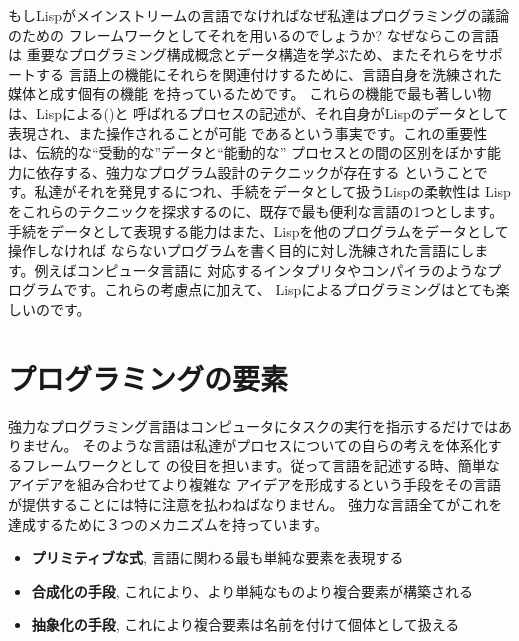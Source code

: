 もしLispがメインストリームの言語でなければなぜ私達はプログラミングの議論のための
フレームワークとしてそれを用いるのでしょうか? なぜならこの言語は
重要なプログラミング構成概念とデータ構造を学ぶため、またそれらをサポートする
言語上の機能にそれらを関連付けするために、言語自身を洗練された媒体と成す個有の機能
を持っているためです。
これらの機能で最も著しい物は、Lispによる()と
呼ばれるプロセスの記述が、それ自身がLispのデータとして表現され、また操作されることが可能
であるという事実です。これの重要性は、伝統的な``受動的な''データと``能動的な''
プロセスとの間の区別をぼかす能力に依存する、強力なプログラム設計のテクニックが存在する
ということです。私達がそれを発見するにつれ、手続をデータとして扱うLispの柔軟性は
Lispをこれらのテクニックを探求するのに、既存で最も便利な言語の1つとします。
手続をデータとして表現する能力はまた、Lispを他のプログラムをデータとして操作しなければ
ならないプログラムを書く目的に対し洗練された言語にします。例えばコンピュータ言語に
対応するインタプリタやコンパイラのようなプログラムです。これらの考慮点に加えて、
Lispによるプログラミングはとても楽しいのです。



\section{プログラミングの要素}
\label{Section 1.1}



強力なプログラミング言語はコンピュータにタスクの実行を指示するだけではありません。
そのような言語は私達がプロセスについての自らの考えを体系化するフレームワークとして
の役目を担います。従って言語を記述する時、簡単なアイデアを組み合わせてより複雑な
アイデアを形成するという手段をその言語が提供することには特に注意を払わねばなりません。
強力な言語全てがこれを達成するために３つのメカニズムを持っています。

\begin{itemize}

\item \textbf{プリミティブな式},
言語に関わる最も単純な要素を表現する

\item \textbf{合成化の手段},
これにより、より単純なものより複合要素が構築される

\item \textbf{抽象化の手段},
これにより複合要素は名前を付けて個体として扱える

\end{itemize}

